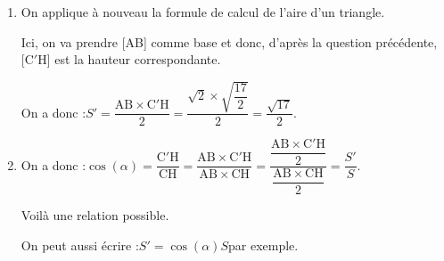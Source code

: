 \documentclass[10pt]{article}
\begin{document}
\begin{enumerate}
\begin{enumerate}
Ainsi, on vient de démontrer que C, C$'$ et H définissent un plan, et que deux droites sécantes du plan (CC'H) sont orthogonales à (AB), donc que (AB) est orthogonale au plan (CC$'$H) et donc à toutes les droites de ce plan là, notamment à la droite (C$'$H).

		\emph{Remarque :} le plan (CC$'$H) est ce que l'on appelle le \textbf{plan médiateur} du segment [AB] : le plan qui passe par le milieu (H) du segment et lui est perpendiculaire.

		\item On applique à nouveau la formule de calcul de l'aire d'un triangle.

Ici, on va prendre [AB] comme base et donc, d'après la question précédente, [C$'$H] est la hauteur correspondante.

On a donc :\quad $S' = \dfrac{\mathrm{AB}\times \mathrm{C'H}}{2} = \dfrac{\sqrt{2} \times \sqrt{\dfrac{17}{2}}}{2} = \dfrac{\sqrt{17}}{2}$.

		\item On a donc :\quad $\cos(\alpha ) = \dfrac{\mathrm{C'H}}{\mathrm{CH}} = \dfrac{\mathrm{AB} \times \mathrm{C'H}}{\mathrm{AB} \times \mathrm{CH}}= \dfrac{\dfrac{\mathrm{AB} \times \mathrm{C'H}}{2}}{\dfrac{\mathrm{AB} \times \mathrm{CH}}{2}} = \dfrac{S'}{S}$.

Voilà une relation possible.

On peut aussi écrire :\quad $S' = \cos(\alpha)S$\quad par exemple.
	\end{enumerate}
\end{enumerate}
\end{document}
